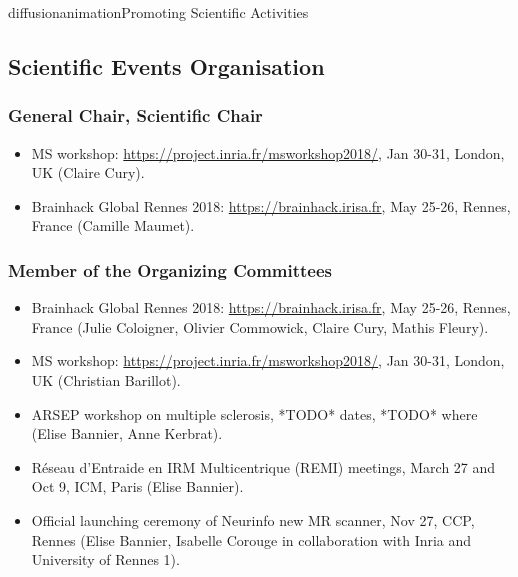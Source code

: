 \documentclass{ra2018}
\begin{document}


\begin{module}{diffusion}{animation}{Promoting Scientific Activities}



\subsection{Scientific Events Organisation}
    \subsubsection{General Chair, Scientific Chair}
    \begin{itemize}
        \item MS workshop: \url{https://project.inria.fr/msworkshop2018/}, Jan 30-31, London, UK (Claire Cury).
        \item Brainhack Global Rennes 2018: \url{https://brainhack.irisa.fr}, May 25-26, Rennes, France (Camille Maumet).
    \end{itemize}    
    

    \subsubsection{Member of the Organizing Committees}
    \begin{itemize}
        \item Brainhack Global Rennes 2018: \url{https://brainhack.irisa.fr}, May 25-26, Rennes, France (Julie Coloigner, Olivier Commowick, Claire Cury, Mathis Fleury).
	    \item MS workshop: \url{https://project.inria.fr/msworkshop2018/}, Jan 30-31, London, UK (Christian Barillot).
        \item ARSEP workshop on multiple sclerosis, *TODO* dates, *TODO* where (Elise Bannier, Anne Kerbrat).
        \item Réseau d'Entraide en IRM Multicentrique (REMI) meetings, March 27 and Oct 9, ICM, Paris (Elise Bannier).
        \item Official launching ceremony of Neurinfo new MR scanner, Nov 27, CCP, Rennes (Elise Bannier, Isabelle Corouge in collaboration with Inria and University of Rennes 1).
    \end{itemize}    

\end{module}
\end{document}
